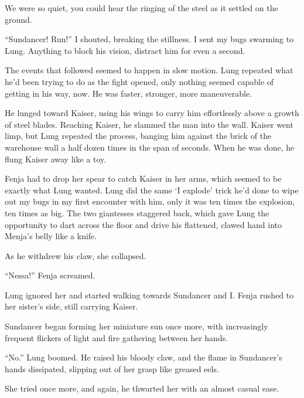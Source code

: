 We were so quiet, you could hear the ringing of the steel as it settled on the ground.



``Sundancer!  Run!'' I shouted, breaking the stillness.  I sent my bugs swarming to Lung.  Anything to block his vision, distract him for even a second.



The events that followed seemed to happen in slow motion.  Lung repeated what he'd been trying to do as the fight opened, only nothing seemed capable of getting in his way, now.  He was faster, stronger, more maneuverable.



He lunged toward Kaiser, using his wings to carry him effortlessly above a growth of steel blades.  Reaching Kaiser, he slammed the man into the wall.  Kaiser went limp, but Lung repeated the process, banging him against the brick of the warehouse wall a half dozen times in the span of seconds.  When he was done, he flung Kaiser away like a toy.



Fenja had to drop her spear to catch Kaiser in her arms, which seemed to be exactly what Lung wanted.  Lung did the same `I explode' trick he'd done to wipe out my bugs in my first encounter with him, only it was ten times the explosion, ten times as big.  The two giantesses staggered back, which gave Lung the opportunity to dart across the floor and drive his flattened, clawed hand into Menja's belly like a knife.



As he withdrew his claw, she collapsed.



``Nessa!'' Fenja screamed.



Lung ignored her and started walking towards Sundancer and I.  Fenja rushed to her sister's side, still carrying Kaiser.



Sundancer began forming her miniature sun once more, with increasingly frequent flickers of light and fire gathering between her hands.



``No.'' Lung boomed.  He raised his bloody claw, and the flame in Sundancer's hands dissipated, slipping out of her grasp like greased eels.



She tried once more, and again, he thwarted her with an almost casual ease.




